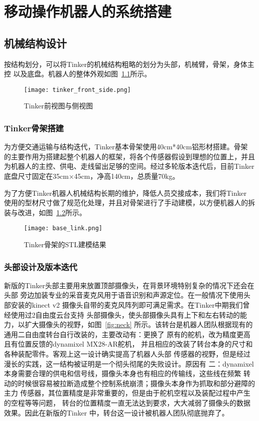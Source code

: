 
\chapter{移动操作机器人的系统搭建}
\label{cha:system}


\section{机械结构设计}

按结构划分，可以将Tinker的机械结构粗略的划分为头部，机械臂，骨架，身体主控
以及底盘。机器人的整体外观如图~\ref{fig:tinker_front_side}所示。

\begin{figure}[ht] %
  \centering
  \texttt{[image: tinker\_front\_side.png]}
  \caption{Tinker前视图与侧视图}
  \label{fig:tinker_front_side}
\end{figure}

\subsection{Tinker骨架搭建}
为方便交通运输与结构迭代，Tinker基本骨架使用40cm*40cm铝形材搭建。骨架
的主要作用为搭建起整个机器人的框架，将各个传感器假设到理想的位置上，并且
为机器人的主控、供电、走线留出足够的空间。经过多轮版本迭代后，目前Tinker
底盘尺寸固定在35cm×45cm，净高140cm，总质量70kg。

为了方便Tinker机器人机械结构长期的维护，降低人员交接成本，我们将Tinker
使用的型材尺寸做了规范化处理，并且对骨架进行了手动建模，以方便机器人的拆
装与改进，如图~\ref{fig:base_link}所示。

\begin{figure}[ht] %
  \centering
  \texttt{[image: base\_link.png]}
  \caption{Tinker骨架的STL建模结果}
  \label{fig:base_link}
\end{figure}

\subsection{头部设计及版本迭代}

新版的Tinker头部主要用来放置顶部摄像头，在背景环境特别复杂的情况下还会在头部
旁边加装专业的采音麦克风用于语音识别和声源定位。在一般情况下使用头部安装的kinect v2
摄像头自带的麦克风阵列即可满足需求。在Tinker中期我们曾经使用过2自由度云台支持
头部摄像头，使头部摄像头具有上下和左右转动的能力，以扩大摄像头的视野，如图~\ref{fig:neck}
所示。该转台是机器人团队根据现有的通用二自由度转台自行改装的，主要改动有：更换了
原有的舵机，改为精度更高且有位置反馈的dynamixel MX28-AR舵机，
并且相应的改装了转台本身的尺寸和各种装配零件。客观上这一设计确实提高了机器人头部
传感器的视野，但是经过漫长的实践，这一结构被证明是一个彻头彻尾的失败设计。原因有
二：dynamixel本身需要合理的供电和信号线，摄像头本身也有相应的传输线，这些线在频繁
转动的时候很容易被拉断造成整个控制系统崩溃；摄像头本身作为抓取和部分避障的主力
传感器，其位置精度是非常重要的，但是由于舵机空程以及装配过程中产生的空程等等问题，
转台的位置精度一直无法达到要求，大大减弱了摄像头的数据效果。因此在新版的Tinker
中，转台这一设计被机器人团队彻底抛弃了。


